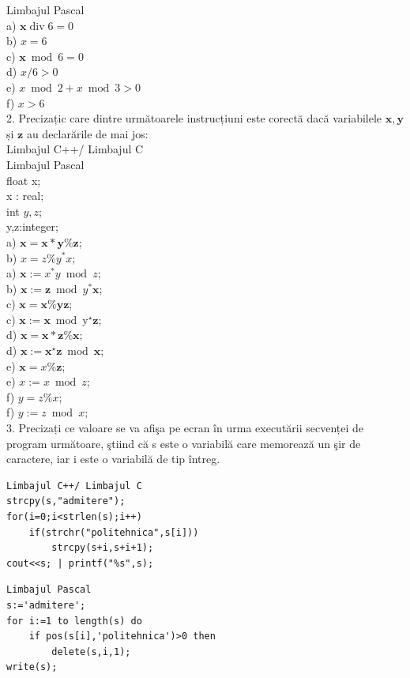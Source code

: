 \documentclass[10pt]{article}
\begin{document}
Limbajul Pascal\\
a) $\mathbf{x} \operatorname{div} 6=0$\\
b) $x=6$\\
c) $\mathbf{x} \bmod 6=0$\\
d) $x / 6>0$\\
e) $x \bmod 2+x \bmod 3>0$\\
f) $x>6$\\
2. Precizațic care dintre următoarele instrucțiuni este corectă dacă variabilele $\mathbf{x}, \mathbf{y}$ și $\mathbf{z}$ au declarările de mai jos:\\
Limbajul C++/ Limbajul C\\
Limbajul Pascal\\
float x;\\
x : real;\\
int $y, z$;\\
y,z:integer;\\
a) $\mathbf{x}=\mathbf{x} * \mathbf{y} \% \mathbf{z}$;\\
b) $x=z \% y^{*} x$;\\
a) $\mathbf{x}:=x^{*} y \bmod z$;\\
b) $\mathbf{x}:=\mathbf{z} \bmod y^{*} \mathbf{x}$;\\
c) $\mathbf{x}=\mathbf{x} \% \mathbf{y} \mathbf{z}$;\\
c) $\mathbf{x}:=\mathbf{x} \bmod \mathrm{y}^{\star} \mathbf{z}$;\\
d) $\mathbf{x}=\mathbf{x *} \mathbf{z} \% \mathbf{x}$;\\
d) $\mathbf{x}:=\mathbf{x}^{\star} \mathbf{z} \bmod \mathbf{x}$;\\
e) $\mathbf{x}=x \% \mathbf{z}$;\\
e) $x:=x \bmod z$;\\
f) $y=z \% x$;\\
f) $y:=z \bmod x ;$\\
3. Precizați ce valoare se va afişa pe ecran în urma executării secvenței de program următoare, ştiind că s este o variabilă care memorează un şir de caractere, iar i este o variabilă de tip întreg.

\begin{verbatim}
Limbajul C++/ Limbajul C
strcpy(s,"admitere");
for(i=0;i<strlen(s);i++)
    if(strchr("politehnica",s[i]))
        strcpy(s+i,s+i+1);
cout<<s; | printf("%s",s);
\end{verbatim}

\begin{verbatim}
Limbajul Pascal
s:='admitere';
for i:=1 to length(s) do
    if pos(s[i],'politehnica')>0 then
        delete(s,i,1);
write(s);
\end{verbatim}
\end{document}
